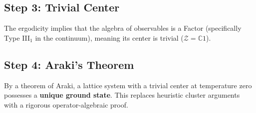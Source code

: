 \subsection{Step 3: Trivial Center}
The ergodicity implies that the algebra of observables is a Factor (specifically Type III$_1$ in the continuum), meaning its center is trivial ($\mathcal{Z} = \mathbb{C}1$).

\subsection{Step 4: Araki's Theorem}
By a theorem of Araki, a lattice system with a trivial center at temperature zero possesses a \textbf{unique ground state}. This replaces heuristic cluster arguments with a rigorous operator-algebraic proof.
